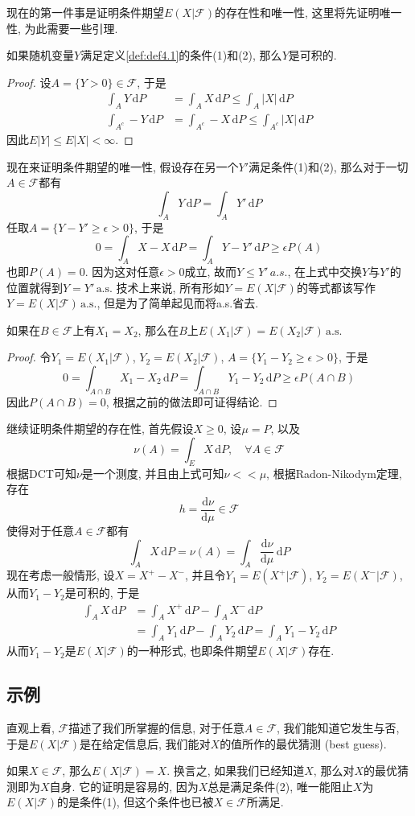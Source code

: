 \documentclass[cn, 12pt, math=mtpro2, bibstyle=apa, blue, twocol]{elegantbook}
\newcommand{\F}{\mathcal{F}}
\begin{document}
现在的第一件事是证明条件期望$E(X|\F)$的存在性和唯一性, 这里将先证明唯一性, 为此需要一些引理.
\begin{lemma}
如果随机变量$Y$满足定义\ref{def:def4.1}的条件(1)和(2), 那么$Y$是可积的.
\end{lemma}
\begin{proof}
  设$A=\{Y>0\}\in\F$, 于是
  \begin{align*}
  \int_AY\,\text{d}P&=\int_AX\,\text{d}P\leq\int_A|X|\,\text{d}P \\
  \int_{A^c}-Y\,\text{d}P&=\int_{A^c}-X\,\text{d}P\leq\int_{A^c}|X|\,\text{d}P
  \end{align*}
  因此$E|Y|\leq E|X|<\infty$.
\end{proof}
现在来证明条件期望的唯一性, 假设存在另一个$Y'$满足条件(1)和(2), 那么对于一切$A\in\F$都有
$$\int_AY\,\text{d}P=\int_AY'\,\text{d}P$$
任取$A=\{Y-Y'\geq\epsilon>0\}$, 于是
$$0=\int_A X-X\,\text{d}P=\int_AY-Y'\,\text{d}P\geq\epsilon P(A)$$
也即$P(A)=0$. 因为这对任意$\epsilon>0$成立, 故而$Y\leq Y'\,a.s.$, 在上式中交换$Y$与$Y'$的位置就得到$Y=Y'\, \text{a.s.}$ 技术上来说, 所有形如$Y=E(X|\F)$的等式都该写作$Y=E(X|\F)\,\text{a.s.}$, 但是为了简单起见而将a.s.省去.

\begin{theorem}\label{thm:thm4.5}
  如果在$B\in\F$上有$X_1=X_2$, 那么在$B$上$E(X_1|\F)=E(X_2|\F)\,\text{a.s.}$
\end{theorem}
\begin{proof}
  令$Y_1=E(X_1|\F)$, $Y_2=E(X_2|\F)$, $A=\{Y_1-Y_2\geq\epsilon>0\}$, 于是
  $$0=\int_{A \cap B}X_1-X_2\,\text{d}P=\int_{A\cap B}Y_1-Y_2\,\text{d}P\geq\epsilon P(A\cap B)$$
  因此$P(A\cap B)=0$, 根据之前的做法即可证得结论.
\end{proof}

继续证明条件期望的存在性, 首先假设$X\geq 0$, 设$\mu=P$, 以及
$$\nu(A)=\int_E X\,\text{d}P,\quad \forall A\in\F$$
根据DCT可知$\nu$是一个测度, 并且由上式可知$\nu<<\mu$, 根据Radon-Nikodym定理, 存在
$$h=\frac{\text{d}\nu}{\text{d}\mu}\in\F$$
使得对于任意$A\in\F$都有
$$\int_AX\,\text{d}P=\nu(A)=\int_A\frac{\text{d}\nu}{\text{d}\mu}\,\text{d}P$$
现在考虑一般情形, 设$X=X^+-X^-$, 并且令$Y_1=E(X^+|\F)$, $Y_2=E(X^-|\F)$, 从而$Y_1-Y_2$是可积的, 于是
\begin{align*}
\int_AX\,\text{d}P&=\int_AX^+\,\text{d}P-\int_AX^-\,\text{d}P \\
&=\int_AY_1\,\text{d}P-\int_AY_2\,\text{d}P=\int_AY_1-Y_2\,\text{d}P
\end{align*}
从而$Y_1-Y_2$是$E(X|\F)$的一种形式, 也即条件期望$E(X|\F)$存在.
\subsection{示例}
直观上看, $\F$描述了我们所掌握的信息, 对于任意$A\in\F$, 我们能知道它发生与否, 于是$E(X|\F)$是在给定信息后, 我们能对$X$的值所作的最优猜测 (best guess).
\begin{example}\label{exp:exp4.1}
如果$X\in\F$, 那么$E(X|\F)=X$. 换言之, 如果我们已经知道$X$, 那么对$X$的最优猜测即为$X$自身. 它的证明是容易的, 因为$X$总是满足条件(2), 唯一能阻止$X$为$E(X|\F)$的是条件(1), 但这个条件也已被$X\in\F$所满足.
\end{example}
\end{document}
